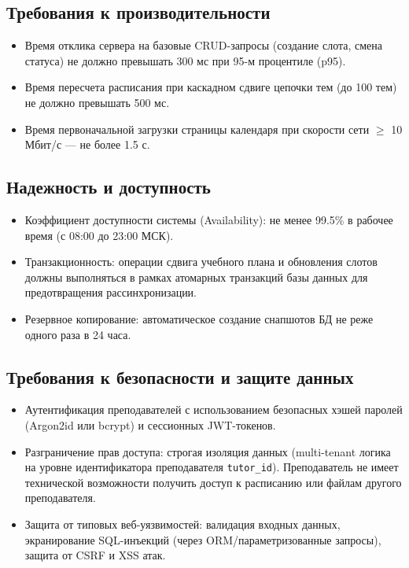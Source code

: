 \documentclass[12pt,a4paper]{article}
\begin{document}
\subsection{Требования к производительности}
\begin{itemize}
    \item Время отклика сервера на базовые CRUD-запросы (создание слота, смена статуса) не должно превышать 300 мс при 95-м процентиле (p95).
    \item Время пересчета расписания при каскадном сдвиге цепочки тем (до 100 тем) не должно превышать 500 мс.
    \item Время первоначальной загрузки страницы календаря при скорости сети $\ge$ 10 Мбит/с — не более 1.5 с.
\end{itemize}

\subsection{Надежность и доступность}
\begin{itemize}
    \item Коэффициент доступности системы (Availability): не менее 99.5\% в рабочее время (с 08:00 до 23:00 МСК).
    \item Транзакционность: операции сдвига учебного плана и обновления слотов должны выполняться в рамках атомарных транзакций базы данных для предотвращения рассинхронизации.
    \item Резервное копирование: автоматическое создание снапшотов БД не реже одного раза в 24 часа.
\end{itemize}

\subsection{Требования к безопасности и защите данных}
\begin{itemize}
    \item Аутентификация преподавателей с использованием безопасных хэшей паролей (Argon2id или bcrypt) и сессионных JWT-токенов.
    \item Разграничение прав доступа: строгая изоляция данных (multi-tenant логика на уровне идентификатора преподавателя \texttt{tutor\_id}). Преподаватель не имеет технической возможности получить доступ к расписанию или файлам другого преподавателя.
    \item Защита от типовых веб-уязвимостей: валидация входных данных, экранирование SQL-инъекций (через ORM/параметризованные запросы), защита от CSRF и XSS атак.
\end{itemize}
\end{document}
